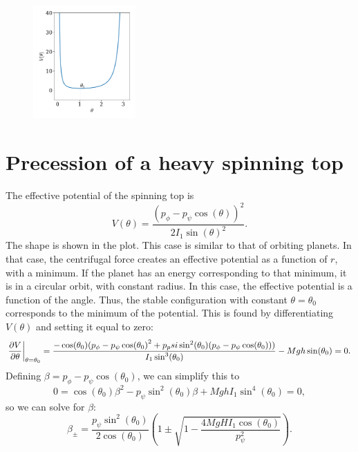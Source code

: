 \documentclass{article}
\begin{document}
    \begin{figure}
        \includegraphics[width=0.35\textwidth]{figures/exercise_3_plot.pdf}
        \vspace{-2cm}
    \end{figure}
    \section{Precession of a heavy spinning top}
        The effective potential of the spinning top is
        \begin{equation*}
            V(\theta) = \frac{\left(p_{\phi} - p_{\psi}\cos(\theta)\right)^2}{2 I_1 \sin(\theta)^2}.
        \end{equation*}
        The shape is shown in the plot. This case is similar to that of orbiting planets. In that case, the centrifugal force creates an effective potential as a function of $r$, with a minimum. If the planet has an energy corresponding to that minimum, it is in a circular orbit, with constant radius. In this case, the effective potential is a function of the angle. Thus, the stable configuration with constant $\theta = \theta_0$ corresponds to the minimum of the potential. This is found by differentiating $V(\theta)$ and setting it equal to zero:
        \begin{equation*}
            \pdv{V}{\theta} \bigg |_{\theta = \theta_0} = \frac{-\cos(\theta_0)(p_\phi - p_\psi \cos(\theta_0)^2 + p_psi \sin^2(\theta_0)(p_\phi - p_\psi \cos(\theta_0)))}{I_1 \sin^3(\theta_0)} - Mgh \sin(\theta_0) = 0.
        \end{equation*}
        Defining $\beta = p_\phi - p_\psi \cos(\theta_0)$, we can simplify this to
        \begin{equation*}
            0 = \cos(\theta_0) \beta^2 - p_\psi \sin^2(\theta_0) \beta  + MghI_1\sin^4(\theta_0) = 0, 
        \end{equation*}
        so we can solve for $\beta$:
        \begin{equation*}
            \beta_\pm = \frac{p_\psi \sin^2(\theta_0)}{2 \cos(\theta_0)} \left( 1 \pm \sqrt{1 - \frac{4 M g H I_1 \cos(\theta_0)}{p_\psi^2}} \right).
        \end{equation*}
\end{document}
